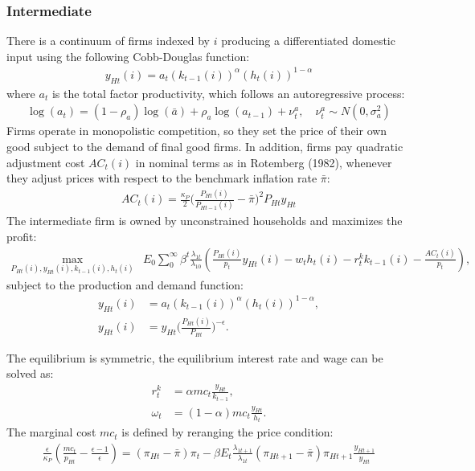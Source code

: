 \documentclass[12pt]{article}
\begin{document}
\subsubsection*{Intermediate}
There is a continuum of firms indexed by $i$ producing a differentiated domestic input using the following Cobb-Douglas function:
\begin{align*}
y_{Ht}(i) = a_t(k_{t-1}(i))^{\alpha}(h_t(i))^{1-\alpha}
\end{align*}
where $a_t$ is the total factor productivity, which follows an autoregressive process: 
\begin{align*}
\log(a_t) = (1-\rho_a)\log(\bar{a})+\rho_a\log(a_{t-1})+\nu_t^a, \quad  \nu_t^a \sim N(0,\sigma_a^2)
\end{align*}
Firms operate in monopolistic competition, so they set the price of their own good subject to the demand of final good firms. In addition, firms pay quadratic adjustment cost $AC_t(i)$ in nominal terms as in Rotemberg (1982), whenever they adjust prices with respect to the benchmark inflation rate $\bar{\pi}$:
\begin{align*}
AC_t(i) = \frac{\kappa_P}{2}\Big(\frac{P_{Ht}(i)}{P_{Ht-1}(i)}-\bar{\pi}\Big)^2P_{Ht}y_{Ht}
\end{align*}
The intermediate firm is owned by unconstrained households and maximizes the profit: 
\begin{align*}
\max_{P_{Ht}(i),y_{Ht}(i),k_{t-1}(i), h_t(i)} &E_0 \sum_0^{\infty}\beta^t\frac{\lambda_{1t}}{\lambda_{10}}(\frac{P_{Ht}(i)}{p_t}y_{Ht}(i)-w_th_t(i)-r_t^kk_{t-1}(i)-\frac{AC_t(i)}{p_t}),
\end{align*}
subject to the production and demand function: 
\begin{align*}
y_{Ht}(i) &= a_t(k_{t-1}(i))^{\alpha}(h_t(i))^{1-\alpha}, \\
y_{Ht}(i) &= y_{Ht}\Big(\frac{P_{Ht}(i)}{P_{Ht}}\Big)^{-\epsilon}.
\end{align*}

The equilibrium is symmetric, the equilibrium interest rate and wage can be solved as: 
\begin{align*}
r_t^k &= \alpha mc_t \frac{y_{Ht}}{k_{t-1}}, \\
\omega_t &= (1-\alpha) mc_t \frac{y_{Ht}}{h_t}.
\end{align*}
The marginal cost $mc_t$ is defined by reranging the price condition: 
\begin{align*}
\frac{\epsilon}{\kappa_P}(\frac{mc_t}{p_{Ht}}-\frac{\epsilon-1}{\epsilon}) = (\pi_{Ht}-\bar{\pi})\pi_t-\beta E_t \frac{\lambda_{1t+1}}{\lambda_{1t}} (\pi_{Ht+1}-\bar{\pi})\pi_{Ht+1}\frac{y_{Ht+1}}{y_{Ht}}
\end{align*}
\end{document}
